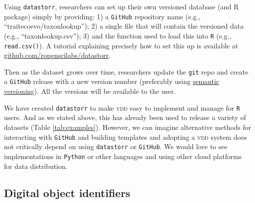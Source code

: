 \documentclass[a4paper,11pt]{article}
\newcommand{\smurl}[1]{{\footnotesize\url{#1}}}
\begin{document}
Using \texttt{datastorr}, researchers can set up their own versioned database (and R package) simply by providing: 1) a \texttt{GitHub} repository name (e.g., ``traitecoevo/taxonlookup''); 2) a single file that will contain the versioned data (e.g., ``taxonlookup.csv''); 3) and the function used to load this into \texttt{R} (e.g., \texttt{read.csv()}). A tutorial explaining precisely how to set this up is available at \smurl{github.com/ropenscilabs/datastorr}.

Then as the dataset grows over time, researchers update the \texttt{git} repo and create a \texttt{GitHub} release with a new version number (preferably
using \href{http://semver.org/}{semantic versioning}). All the versions
will be available to the user. 


We have created \texttt{datastorr} to make \textsc{vdd} easy to implement and manage for \texttt{R} users. And as we stated above, this has already been used to release a variety of datasets (Table \ref{tab:examples}).
However, we can imagine alternative methods for interacting with \texttt{GitHub} and building templates and adopting a \textsc{vdd} system does not critically depend on using \texttt{datastorr} or \texttt{GitHub}. We would love to see implementations in \texttt{Python} or other languages and using other cloud platforms for data distribution.


\subsection{Digital object identifiers}

\end{document}
